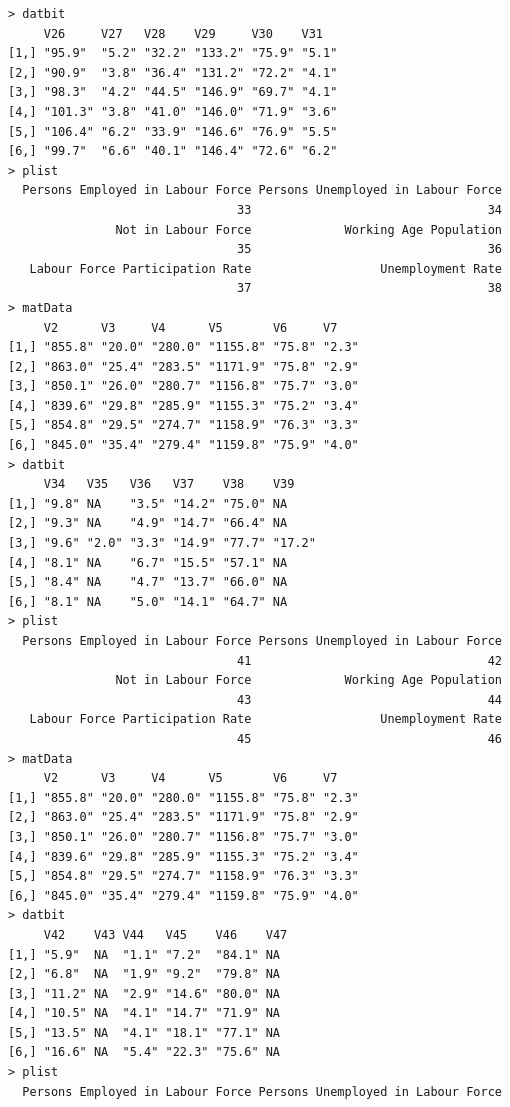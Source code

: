 \documentclass[a4paper]{article}
\begin{document}
\begin{verbatim}
> datbit 
     V26     V27   V28    V29     V30    V31  
[1,] "95.9"  "5.2" "32.2" "133.2" "75.9" "5.1"
[2,] "90.9"  "3.8" "36.4" "131.2" "72.2" "4.1"
[3,] "98.3"  "4.2" "44.5" "146.9" "69.7" "4.1"
[4,] "101.3" "3.8" "41.0" "146.0" "71.9" "3.6"
[5,] "106.4" "6.2" "33.9" "146.6" "76.9" "5.5"
[6,] "99.7"  "6.6" "40.1" "146.4" "72.6" "6.2"
> plist 
  Persons Employed in Labour Force Persons Unemployed in Labour Force 
                                33                                 34 
               Not in Labour Force             Working Age Population 
                                35                                 36 
   Labour Force Participation Rate                  Unemployment Rate 
                                37                                 38 
> matData 
     V2      V3     V4      V5       V6     V7   
[1,] "855.8" "20.0" "280.0" "1155.8" "75.8" "2.3"
[2,] "863.0" "25.4" "283.5" "1171.9" "75.8" "2.9"
[3,] "850.1" "26.0" "280.7" "1156.8" "75.7" "3.0"
[4,] "839.6" "29.8" "285.9" "1155.3" "75.2" "3.4"
[5,] "854.8" "29.5" "274.7" "1158.9" "76.3" "3.3"
[6,] "845.0" "35.4" "279.4" "1159.8" "75.9" "4.0"
> datbit 
     V34   V35   V36   V37    V38    V39   
[1,] "9.8" NA    "3.5" "14.2" "75.0" NA    
[2,] "9.3" NA    "4.9" "14.7" "66.4" NA    
[3,] "9.6" "2.0" "3.3" "14.9" "77.7" "17.2"
[4,] "8.1" NA    "6.7" "15.5" "57.1" NA    
[5,] "8.4" NA    "4.7" "13.7" "66.0" NA    
[6,] "8.1" NA    "5.0" "14.1" "64.7" NA    
> plist 
  Persons Employed in Labour Force Persons Unemployed in Labour Force 
                                41                                 42 
               Not in Labour Force             Working Age Population 
                                43                                 44 
   Labour Force Participation Rate                  Unemployment Rate 
                                45                                 46 
> matData 
     V2      V3     V4      V5       V6     V7   
[1,] "855.8" "20.0" "280.0" "1155.8" "75.8" "2.3"
[2,] "863.0" "25.4" "283.5" "1171.9" "75.8" "2.9"
[3,] "850.1" "26.0" "280.7" "1156.8" "75.7" "3.0"
[4,] "839.6" "29.8" "285.9" "1155.3" "75.2" "3.4"
[5,] "854.8" "29.5" "274.7" "1158.9" "76.3" "3.3"
[6,] "845.0" "35.4" "279.4" "1159.8" "75.9" "4.0"
> datbit 
     V42    V43 V44   V45    V46    V47
[1,] "5.9"  NA  "1.1" "7.2"  "84.1" NA 
[2,] "6.8"  NA  "1.9" "9.2"  "79.8" NA 
[3,] "11.2" NA  "2.9" "14.6" "80.0" NA 
[4,] "10.5" NA  "4.1" "14.7" "71.9" NA 
[5,] "13.5" NA  "4.1" "18.1" "77.1" NA 
[6,] "16.6" NA  "5.4" "22.3" "75.6" NA 
> plist 
  Persons Employed in Labour Force Persons Unemployed in Labour Force 

\end{verbatim}
\end{document}
